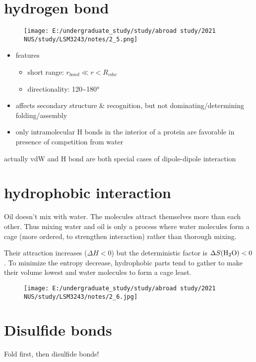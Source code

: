\hypertarget{hydrogen-bond-1}{%
	\section{hydrogen bond}\label{hydrogen-bond-1}}

\begin{figure}
	\centering
	\texttt{[image: E:/undergraduate\_study/study/abroad study/2021 NUS/study/LSM3243/notes/2\_5.png]}
\end{figure}

\begin{itemize}
	\item
	features
	
	\begin{itemize}
		\item
		short range: \(r_{bond}\ll r<R_{vdw}\)
		\item
		directionality: 120\textasciitilde{}180°
	\end{itemize}
	\item
	affects secondary structure \& recognition, but not
	dominating/determining folding/assembly
	\item
	only intramolecular H bonds in the interior of a protein are favorable
	in presence of competition from water
\end{itemize}

actually vdW and H bond are both special cases of dipole-dipole
interaction

\hypertarget{hydrophobic-interaction}{%
	\section{hydrophobic interaction}\label{hydrophobic-interaction}}

Oil doesn't mix with water. The molecules attract themselves more than
each other. Thus mixing water and oil is only a process where water
molecules form a cage (more ordered, to strengthen interaction) rather
than thorough mixing.

Their attraction increases (\(\Delta H<0\)) but the deterministic factor
is \(\Delta S(\ce{H2O})<0\). To minimize the entropy decrease,
hydrophobic parts tend to gather to make their volume lowest and water
molecules to form a cage least.

\begin{figure}
	\centering
	\texttt{[image: E:/undergraduate\_study/study/abroad study/2021 NUS/study/LSM3243/notes/2\_6.jpg]}
\end{figure}

\hypertarget{disulfide-bonds}{%
	\section{Disulfide bonds}\label{disulfide-bonds}}

Fold first, then disulfide bonds!